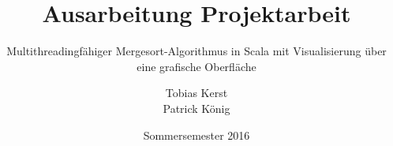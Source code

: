 \documentclass[a4paper,titlepage,12pt]{scrreprt}
\begin{document}
\titlehead{
	\texttt{[image: hska\_logo]}
}

\title{Ausarbeitung Projektarbeit}
\subtitle{Multithreadingfähiger Mergesort-Algorithmus in Scala mit Visualisierung über eine grafische Oberfläche}
\author{%
	Tobias Kerst \\
	Patrick König
}
\date{Sommersemester 2016}
\publishers{
    \textbf{Dozent:} Prof. Dr. Heiko Körner
}
\maketitle

\clearpage

\begingroup
\hypersetup{linkcolor=black}
\tableofcontents
\endgroup

\clearpage


\clearpage


\clearpage


\clearpage


\clearpage


\clearpage



\end{document}
